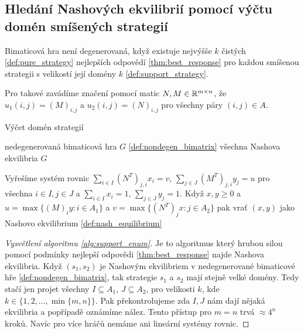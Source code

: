 \subsection{Hledání Nashových ekvilibrií pomocí výčtu domén smíšených strategií}
\begin{definition}
\label{def:nondegen_bimatrix}
Bimaticová hra není degenerovaná, když existuje nejvýšše $k$ čistých \ref{def:pure_strategy} nejlepších odpovědí \ref{thm:best_response} pro každou smíšenou strategii s velikostí její domény $k$ \ref{def:support_strategy}.

Pro takové zavádíme značení pomocí matic $N,M \in \mathbb{R}^{m\times n}$, že $u_1(i,j) = (M)_{i,j}$ a $u_2(i,j) = (N)_{i,j}$ pro všechny páry $(i,j) \in A$.
\end{definition}
\begin{algorithm}
    \algrenewcommand{}
    \algrenewcommand{}
    \caption{Výčet domén strategií}
    \label{alg:support_enum}
    \begin{algorithmic}[1]
        \Require  nedegenerovaná bimaticová hra $G$ \ref{def:nondegen_bimatrix}
        \Ensure  všechna Nashova ekvilibria $G$
        
            \State Vyřešíme systém rovnic $\sum_{i\in I} (N^T)_{j,i} x_i = v$, $\sum_{j\in J} (M^T)_{j,i} y_j = u$ pro všechna $i\in I, j\in J$ a $\sum_{i \in I} x_i = 1$, $\sum_{j \in J} y_j = 1$.
            \State Když $x,y\geq 0$ a $u = \max\{(M)_{i}y: i \in A_1\}$ a $v = \max\{(N^T)_{j}x: j \in A_2\}$ pak vrať $(x,y)$ jako Nashovo ekvilibrium \ref{def:nash_equilibrium}
        \EndFor
    \end{algorithmic}
\end{algorithm}

\begin{proof}[Vysvětlení algoritmu \ref{alg:support_enum}]
    Je to algoritmus který hrubou silou pomocí podmínky nejlepší odpovědi \ref{thm:best_response} najde Nashova ekvilibria. 
Když $(s_1,s_2)$ je Nashovým ekvilibriem v nedegenerované bimaticové hře \ref{def:nondegen_bimatrix}, tak strategie $s_1$ a $s_2$ mají stejně velké domény. 
Tedy stačí jen projet všechny $I\subseteq A_1$, $J \subseteq A_2$, pro velikosti $k$, kde $k \in \{1,2,\dots, \min\{m,n\}\}$. 
Pak překontrolujeme zda $I,J$ nám dají nějaká ekvilibria a popřípadě oznámíme nález. 
Tento přístup pro $m = n$ trvá $\approx 4^n$ kroků. 
Navíc pro více hráčů nemáme ani lineární systémy rovnic. 
\end{proof}


